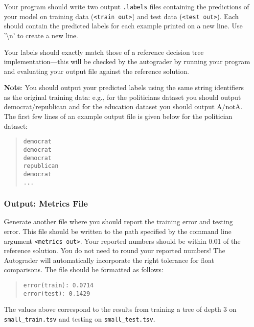 Your program should write two output \lstinline{.labels} files containing the predictions of your model on training data (\lstinline{<train out>}) and test data (\lstinline{<test out>}). Each should contain the predicted labels for each example printed on a new line. Use '\textbackslash n' to create a new line.

Your labels should exactly match those of a reference decision tree implementation---this will be checked by the autograder by running your program and evaluating your output file against the reference solution.

\textbf{Note}: You should output your predicted labels using the same string identifiers as the original training data: e.g., for the politicians dataset you should output democrat/republican and for the education dataset you should output A/notA.
%
The first few lines of an example output file is given below for the politician dataset:
\begin{quote}
\begin{verbatim}
democrat
democrat
democrat
republican
democrat
...
\end{verbatim}
\end{quote}

\subsubsection{Output: Metrics File}
\label{sec:metrics}

Generate another file where you should report the training error and testing error. This file should be written to the path specified by the command line argument \lstinline{<metrics out>}. Your reported numbers should be within 0.01 of the reference solution. You do not need to round your reported numbers! The Autograder will automatically incorporate the right tolerance for float comparisons. The file should be formatted as follows:

\begin{quote}
\begin{verbatim}
error(train): 0.0714
error(test): 0.1429
\end{verbatim}
\end{quote}

The values above correspond to the results from training a tree of depth 3 on \texttt{small\_train.tsv} and testing on \texttt{small\_test.tsv}.


